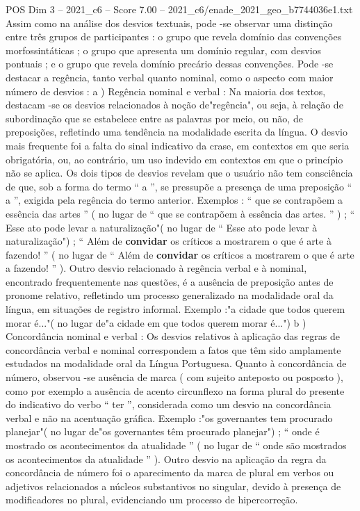 \begin{textsample}{POS Dim 3 – 2021\_c6 – Score 7.00 – 2021\_c6/enade\_2021\_geo\_b7744036e1.txt}
Assim como na análise dos desvios textuais, pode -se observar uma distinção entre três grupos de participantes : o grupo que revela domínio das convenções morfossintáticas ; o grupo que apresenta um domínio regular, com desvios pontuais ; e o grupo que revela domínio precário dessas convenções.
Pode -se destacar a regência, tanto verbal quanto nominal, como o aspecto com maior número de desvios : a ) Regência nominal e verbal : Na maioria dos textos, destacam -se os desvios relacionados à noção de"regência", ou seja, à relação de subordinação que se estabelece entre as palavras por meio, ou não, de preposições, refletindo uma tendência na modalidade escrita da língua.
O desvio mais frequente foi a falta do sinal indicativo da crase, em contextos em que seria obrigatória, ou, ao contrário, um uso indevido em contextos em que o princípio não se aplica.
Os dois tipos de desvios revelam que o usuário não tem consciência de que, sob a forma do termo “ a ”, se pressupõe a presença de uma preposição “ a ”, exigida pela regência do termo anterior.
Exemplos : “ que se contrapõem a essência das artes ” ( no lugar de “ que se contrapõem à essência das artes. ” ) ; “ Esse ato pode levar a naturalização"( no lugar de “ Esse ato pode levar à naturalização") ; “ Além de \textbf{convidar} os críticos a mostrarem o que é arte à fazendo! ” ( no lugar de “ Além de \textbf{convidar} os críticos a mostrarem o que é arte a fazendo! ” ).
Outro desvio relacionado à regência verbal e à nominal, encontrado frequentemente nas questões, é a ausência de preposição antes de pronome relativo, refletindo um processo generalizado na modalidade oral da língua, em situações de registro informal.
Exemplo :"a cidade que todos querem morar é..."( no lugar de"a cidade em que todos querem morar é...") b ) Concordância nominal e verbal : Os desvios relativos à aplicação das regras de concordância verbal e nominal correspondem a fatos que têm sido amplamente estudados na modalidade oral da Língua Portuguesa.
Quanto à concordância de número, observou -se ausência de marca ( com sujeito anteposto ou posposto ), como por exemplo a ausência de acento circunflexo na forma plural do presente do indicativo do verbo “ ter ”, considerada como um desvio na concordância verbal e não na acentuação gráfica.
Exemplo :"os governantes tem procurado planejar"( no lugar de"os governantes têm procurado planejar") ; “ onde é mostrado os acontecimentos da atualidade ” ( no lugar de “ onde são mostrados os acontecimentos da atualidade ” ).
Outro desvio na aplicação da regra da concordância de número foi o aparecimento da marca de plural em verbos ou adjetivos relacionados a núcleos substantivos no singular, devido à presença de modificadores no plural, evidenciando um processo de hipercorreção.

\end{textsample}
